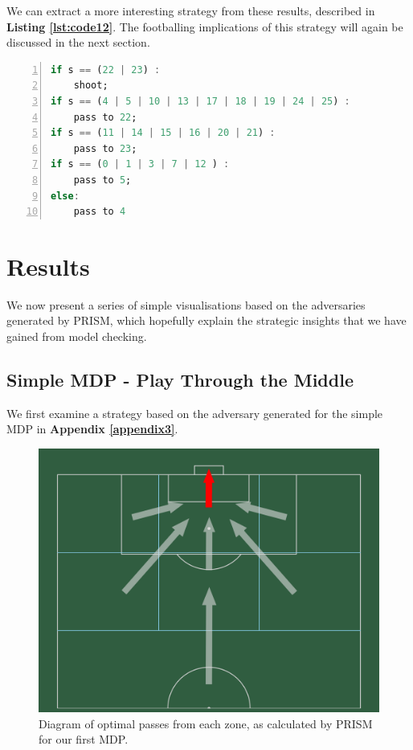 \documentclass{l4proj}
\begin{document}
We can extract a more interesting strategy from these results, described in \textbf{Listing \ref{lst:code12}}. The footballing implications of this strategy will again be discussed in the next section.

\clearpage
\begin{lstlisting}[language=Haskell, numbers=left, caption=Strategy with optimal probability of goal generated by PRISM from our refined MDP.] 
if s == (22 | 23) :
    shoot;
if s == (4 | 5 | 10 | 13 | 17 | 18 | 19 | 24 | 25) :
    pass to 22;
if s == (11 | 14 | 15 | 16 | 20 | 21) :
    pass to 23;
if s == (0 | 1 | 3 | 7 | 12 ) :
    pass to 5;
else:
    pass to 4
\end{lstlisting}\label{lst:code12}

\section{Results}\label{sec:results}

We now present a series of simple visualisations based on the adversaries generated by PRISM, which hopefully explain the strategic insights that we have gained from model checking. 

\subsection{Simple MDP - Play Through the Middle}

We first examine a strategy based on the adversary generated for the simple MDP in \textbf{Appendix \ref{appendix3}}. 

\begin{figure}[h]
    \centering
    \includegraphics[scale=0.1]{images/bigzonestrat.png}   
    \caption{Diagram of optimal passes from each zone, as calculated by PRISM for our first MDP.}
    \label{fig:bigzonesstrat} 
\end{figure}
\end{document}
